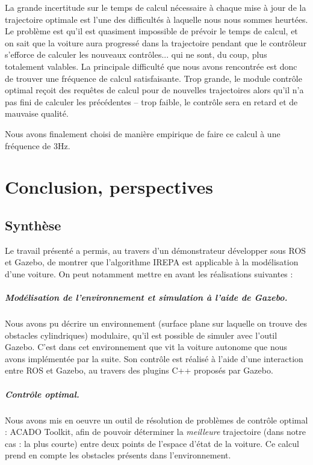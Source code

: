 \documentclass[a4paper,12pt]{report}
\begin{document}
\vspace{0.5cm}



La grande incertitude sur le temps de calcul nécessaire à chaque mise à jour de la trajectoire optimale est l'une des difficultés à laquelle nous nous sommes heurtées. Le problème est qu'il est quasiment impossible de prévoir le temps de calcul, et on sait que la voiture aura progressé dans la trajectoire pendant que le contrôleur s'efforce de calculer les nouveaux contrôles... qui ne sont, du coup, plus totalement valables. La principale difficulté que nous avons rencontrée est donc de trouver une fréquence de calcul satisfaisante. Trop grande, le module contrôle optimal reçoit des requêtes de calcul pour de nouvelles trajectoires alors qu'il n'a pas fini de calculer les précédentes -- trop faible, le contrôle sera en retard et de mauvaise qualité.

Nous avons finalement choisi de manière empirique de faire ce calcul à une fréquence de 3Hz.

\chapter{Conclusion, perspectives}
\section{Synthèse}
Le travail présenté a permis, au travers d'un démonstrateur développer sous ROS et Gazebo, de montrer que l'algorithme IREPA est applicable à la modélisation d'une voiture. On peut notamment mettre en avant les réalisations suivantes : 


\paragraph{Modélisation de l'environnement et simulation à l'aide de Gazebo.} Nous avons pu décrire un environnement (surface plane sur laquelle on trouve des obstacles cylindriques) modulaire, qu'il est possible de simuler avec l'outil Gazebo. C'est dans cet environnement que vit la voiture autonome que nous avons implémentée par la suite. Son contrôle est réalisé à l'aide d'une interaction entre ROS et Gazebo, au travers des plugins C++ proposés par Gazebo.

\paragraph{Contrôle optimal.} Nous avons mis en oeuvre un outil de résolution de problèmes de contrôle optimal : ACADO Toolkit, afin de pouvoir déterminer la \textit{meilleure} trajectoire (dans notre cas : la plus courte) entre deux points de l'espace d'état de la voiture. Ce calcul prend en compte les obstacles présents dans l'environnement.
\end{document}
